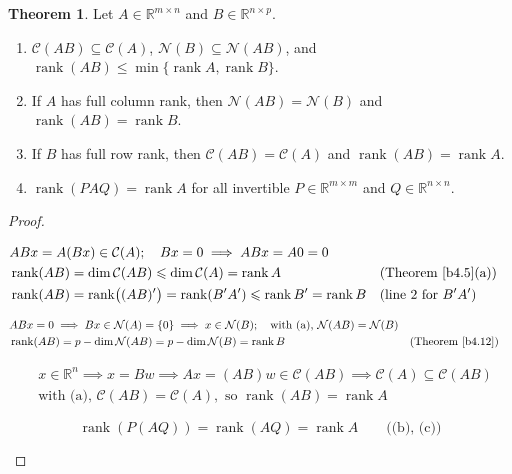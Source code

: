 \documentclass[12pt]{article}
\newcommand{\R}{\mathbb R}
\DeclareMathOperator{\rank}{rank}
\theoremstyle{definition}
\newtheorem{theorem}{Theorem}
\newcommand{\boardtop}{\vspace*{-\abovedisplayskip}}
\begin{document}
\begin{theorem}\label{b4.15}
Let \(A\in\R^{m\times n}\) and \(B\in\R^{n\times p}\).
\begin{enumerate}
\item \(\mathcal C(AB)\subseteq\mathcal C(A)\), \(\mathcal N(B)\subseteq\mathcal N(AB)\), and
\(\rank(AB)\leqslant\min\{\rank A,\rank B\}\).
\item If \(A\) has full column rank, then \(\mathcal N(AB)=\mathcal N(B)\) and \(\rank(AB)=\rank B\).
\item If \(B\) has full row rank, then \(\mathcal C(AB)=\mathcal C(A)\) and \(\rank(AB)=\rank A\).
\item \(\rank(PAQ)=\rank A\) for all invertible \(P\in\R^{m\times m}\) and \(Q\in\R^{n\times n}\).
\end{enumerate}
\end{theorem}
\begin{proof}
\begin{board}[(a) \((AB)'=B'A'\) (\lec{1}, \lit{Theorem~8}); Theorem~\ref{b4.13}(a):]
\boardtop
\begin{align*}
&ABx=A(Bx)\in\mathcal C(A);\quad Bx=0\implies ABx=A0=0\\
&\rank(AB)=\dim\mathcal C(AB)\leqslant\dim\mathcal C(A)=\rank A&&\text{(Theorem~\ref{b4.5}(a))}\\
&\rank(AB)=\rank\bigl((AB)'\bigr)=\rank(B'A')\leqslant\rank B'=\rank B&&\text{(line 2 for \(B'A'\))}
\end{align*}
\end{board}
\begin{board}[(b) \(\mathcal N(A)=\{0\}\) (Theorem~\ref{b4.13}(b)):]
\boardtop
\begin{align*}
&ABx=0\implies Bx\in\mathcal N(A)=\{0\}\implies x\in\mathcal N(B);\quad\text{with (a), }\mathcal N(AB)=\mathcal N(B)\\
&\rank(AB)=p-\dim\mathcal N(AB)=p-\dim\mathcal N(B)=\rank B&&\text{(Theorem~\ref{b4.12})}
\end{align*}
\end{board}
\begin{board}[(c) \(\mathcal C(B)=\R^n\) (Theorem~\ref{b4.13}(c)):]
\boardtop
\begin{align*}
&x\in\R^n\implies x=Bw\implies Ax=(AB)w\in\mathcal C(AB)\implies\mathcal C(A)\subseteq\mathcal C(AB)\\
&\text{with (a), }\mathcal C(AB)=\mathcal C(A),\text{ so }\rank(AB)=\rank A
\end{align*}
\end{board}
\begin{board}[(d) \(\rank P=m\), \(\rank Q=n\) (Theorem~\ref{b4.13}(d)): \(P\) has full column rank, \(Q\) full row rank
(Definition~\ref{b4.11}):]
\[
\rank(P(AQ))=\rank(AQ)=\rank A\qquad\text{((b), (c))}
\]
\end{board}
\nopagebreak
\end{proof}
\end{document}
